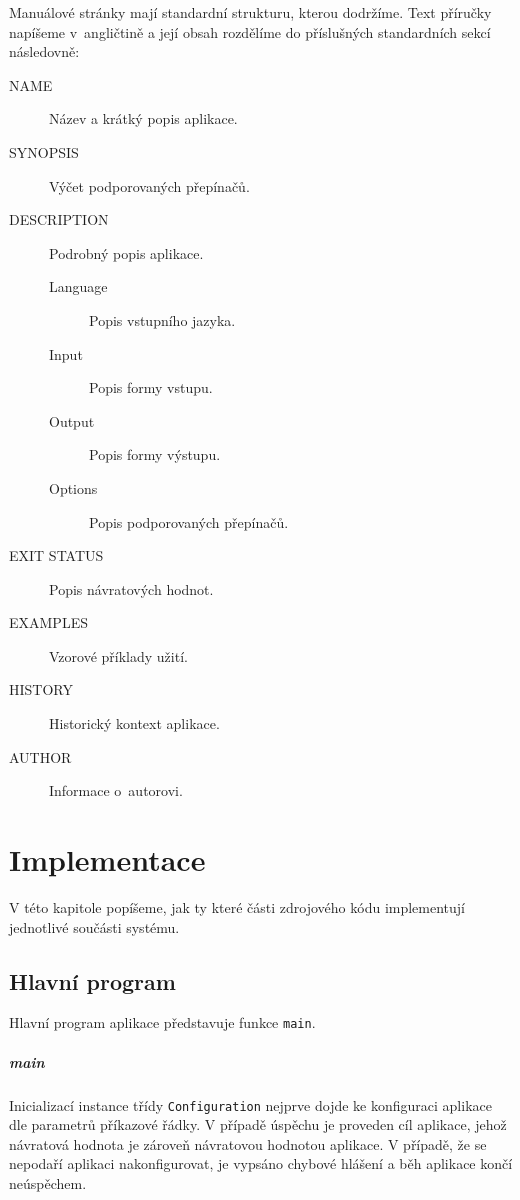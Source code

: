 \documentclass[thesis=B,czech,hidelinks]{thesis}[2012/06/26]
\begin{document}
Manuálové stránky mají standardní strukturu, kterou dodržíme. Text příručky napíšeme v~angličtině a její obsah rozdělíme do příslušných standardních sekcí následovně:

\begin{description}
	\item[NAME]  Název a krátký popis aplikace.
	\item[SYNOPSIS] Výčet podporovaných přepínačů.
	\item[DESCRIPTION] Podrobný popis aplikace.
	\begin{description}
		\item[Language] Popis vstupního jazyka.
		\item[Input] Popis formy vstupu.
		\item[Output] Popis formy výstupu.
		\item[Options] Popis podporovaných přepínačů.
	\end{description}
	\item[EXIT STATUS] Popis návratových hodnot.
	\item[EXAMPLES] Vzorové příklady užití.
	\item[HISTORY] Historický kontext aplikace.
	\item[AUTHOR] Informace o~autorovi.
\end{description}

%
%
%

\chapter{Implementace}

V této kapitole popíšeme, jak ty které části zdrojového kódu implementují jednotlivé součásti systému.

\section{Hlavní program}

Hlavní program aplikace představuje funkce \texttt{main}.

\paragraph{main}

Inicializací instance třídy \texttt{Configuration} nejprve dojde ke konfiguraci aplikace dle parametrů příkazové řádky. V případě úspěchu je proveden cíl aplikace, jehož návratová hodnota je zároveň návratovou hodnotou aplikace. V případě, že se nepodaří aplikaci nakonfigurovat, je vypsáno chybové hlášení a běh aplikace končí neúspěchem.
\end{document}
